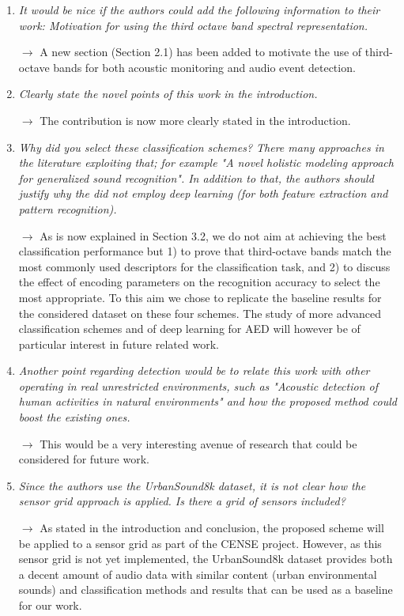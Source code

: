 \documentclass[10pt]{article}
\begin{document}
\begin{enumerate}

\item \emph{It would be nice if the authors could add the following information to their work: Motivation for using the third octave band spectral representation.}

$\rightarrow$ A new section (Section 2.1) has been added to motivate the use of third-octave bands for both acoustic monitoring and audio event detection.

\item \emph{Clearly state the novel points of this work in the introduction.}

$\rightarrow$ The contribution is now more clearly stated in the introduction.

\item \emph{Why did you select these classification schemes? There many approaches in the literature exploiting that; for example "A novel holistic modeling approach for generalized sound recognition". In addition to that, the authors should justify why the did not employ deep learning (for both feature extraction and pattern recognition).}

$\rightarrow$ As is now explained in Section 3.2, we do not aim at achieving the best classification performance but 1) to prove that third-octave bands match the most commonly used descriptors for the classification task, and 2) to discuss the effect of encoding parameters on the recognition accuracy to select the most appropriate. To this aim we chose to replicate the baseline results for the considered dataset on these four schemes.
The study of more advanced classification schemes and of deep learning for AED will however be of particular interest in future related work.

\item \emph{Another point regarding detection would be to relate this work with other operating in real unrestricted environments, such as "Acoustic detection of human activities in natural environments" and how the proposed method could boost the existing ones.}

$\rightarrow$ This would be a very interesting avenue of research that could be considered for future work. 

\item \emph{Since the authors use the UrbanSound8k dataset, it is not clear how the sensor grid approach is applied. Is there a grid of sensors included?}

$\rightarrow$ As stated in the introduction and conclusion, the proposed scheme will be applied to a sensor grid as part of the CENSE project. However, as this sensor grid is not yet implemented, the UrbanSound8k dataset provides both a decent amount of audio data with similar content (urban environmental sounds) and classification methods and results that can be used as a baseline for our work. 


\end{enumerate}
\end{document}
